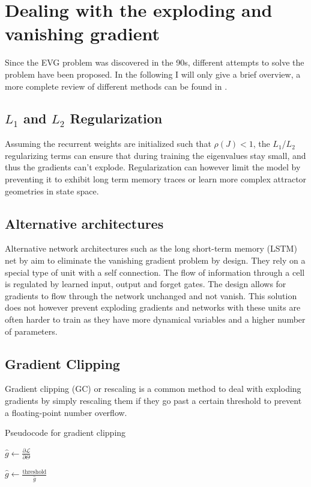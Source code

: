 \section{Dealing with the exploding and vanishing gradient}

Since the EVG problem was discovered in the 90s, different attempts to solve the problem have been proposed. In the following I will only
give a brief overview, a more complete review of different methods can be found in \cite{pascanu2013difficulty}.

\subsection{\texorpdfstring{$L_1$}{ Lg} and \texorpdfstring{$L_2$}{ Lg} Regularization}

Assuming the recurrent weights are initialized such that $\rho(J)<1$, the $L_1$/$L_2$ regularizing terms can ensure that during training the eigenvalues
stay small, and thus the gradients can't explode. Regularization can however limit the model by preventing it to exhibit long term memory traces or learn
more complex attractor geometries in state space.

\subsection{Alternative architectures}
Alternative network architectures such as the long short-term memory (LSTM) net by \cite{hochreiter1997long} aim to eliminate the vanishing gradient problem by design. They rely on a special type of unit
with a self connection. The flow of information through a cell is regulated by learned input, output and forget gates. The design allows for gradients to
flow through the network unchanged and not vanish. This solution does not however prevent exploding gradients
and networks with these units are often harder to train as they have more dynamical variables and a higher number of parameters.

\subsection{Gradient Clipping}
Gradient clipping (GC) or rescaling is a common method to deal with exploding gradients by simply rescaling them if they go past a certain threshold to 
prevent a floating-point number overflow.

\begin{algorithm}
    \caption{Pseudocode for gradient clipping}\label{alg:cap}
    \begin{algorithmic}
        \State $\hat{g} \gets \frac{\partial \mathcal{L}}{\partial \Theta}$

            \State $\hat{g} \gets \frac{\text{threshold}}{\hat{g}}$
        \EndIf
    \end{algorithmic}
\end{algorithm}

